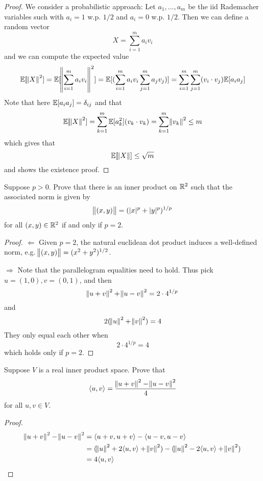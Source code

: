 \documentclass{extarticle}
\begin{document}
\begin{proof}
We consider a probabilistic approach: Let \(a_1, \ldots, a_m\) be the iid Rademacher variables 
such with \(a_i = 1\) w.p. \(1/2\) and \(a_i = 0\) w.p. \(1/2\). Then we can define a random 
vector 
\[X = \sum_{i=1}^{m}a_i v_i\] 
and we can compute the expected value  
\[\mathbb{E} [\norm{X}^2] 
= \mathbb{E}[ \norm{\sum_{i=1}^{m} a_i v_i} ^2  ] 
= \mathbb{E} [   (\sum_{i=1}^{m} a_i v_i \sum_{j=1}^{m}a_j v_j)   ] 
=  \sum_{i=1}^{m} \sum_{j=1}^{m} (v_i \cdot v_j) \mathbb{E} [a_i a_j]\]
Note that here \(\mathbb{E}[a_i a_j] = \delta_{ij}\) and that 
\[\mathbb{E} [\norm{X}^2] = \sum_{k=1}^{m} \mathbb{E}[a_k^2](v_k \cdot v_k) = \sum_{k=1}^{m} \norm{v_k}^2 \leq m\]
which gives that 
\[\mathbb{E}[\norm{X}] \leq \sqrt{m}\]
and shows the existence proof.
\end{proof}



\begin{problem}{25}
    Suppose \(p > 0\). Prove that there is an inner product on \(\mathbb{R}^2\) such that the associated norm 
    is given by 
    \[\norm{(x, y)} = (|x|^p + |y|^{p})^{1/p}\]
    for all \((x,y) \in \mathbb{R}^2\) if and only if \(p = 2\). 
\end{problem}


\begin{proof}
\(\Leftarrow\) Given \(p = 2\), the natural euclidean dot product induces a well-defined norm, e.g. 
\(\norm{(x,y)} = (x^2 + y^2)^{1/2}\). 

\(\Rightarrow\) Note that the parallelogram equalities need to hold. Thus pick \(u = (1,0), v = (0, 1)\), 
and then 
\[\norm{u + v}^2 + \norm{u - v}^2 = 2\cdot4^{1/p} \]
and 
\[2(\norm{u}^2 + \norm{v}^2) = 4\]
They only equal each other when 
\[2 \cdot 4^{1/p} = 4\]
which holds only if \(p = 2\).
\end{proof}


\begin{problem}{26}
    Suppose \(V\) is a real inner product space. Prove that 
    \[\langle u,v \rangle = \frac{\norm{u + v}^2 - \norm{u - v}^2}{4}\]
    for all \(u, v \in V\). 
\end{problem}

\begin{proof}

\begin{align*}
    \norm{u + v}^2 - \norm{u - v}^2 
    &= \langle u+v,u+v \rangle - \langle u-v,u-v \rangle \\ 
    &= (\norm{u}^2 + 2 \langle u,v \rangle + \norm{v}^2) - (\norm{u}^2 - 2 \langle u,v \rangle + \norm{v}^2) \\ 
    &= 4 \langle u,v \rangle
\end{align*}
\end{proof}
\end{document}
